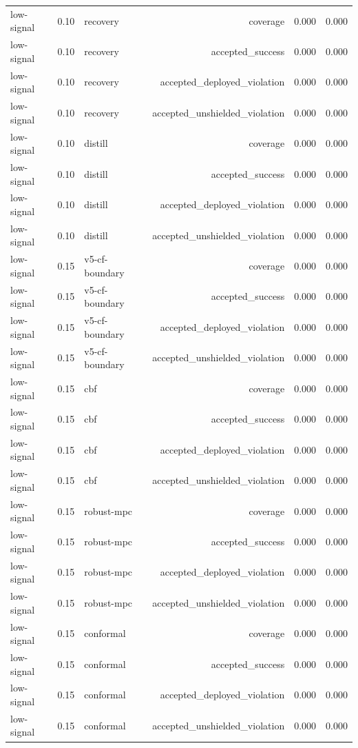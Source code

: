 \documentclass{article}
\begin{document}
\begin{longtable}{@{}lllrrr@{}}
low-signal & 0.10 & recovery & coverage & 0.000 & 0.000 \\
low-signal & 0.10 & recovery & accepted\_success & 0.000 & 0.000 \\
low-signal & 0.10 & recovery & accepted\_deployed\_violation & 0.000 & 0.000 \\
low-signal & 0.10 & recovery & accepted\_unshielded\_violation & 0.000 & 0.000 \\
low-signal & 0.10 & distill & coverage & 0.000 & 0.000 \\
low-signal & 0.10 & distill & accepted\_success & 0.000 & 0.000 \\
low-signal & 0.10 & distill & accepted\_deployed\_violation & 0.000 & 0.000 \\
low-signal & 0.10 & distill & accepted\_unshielded\_violation & 0.000 & 0.000 \\
low-signal & 0.15 & v5-cf-boundary & coverage & 0.000 & 0.000 \\
low-signal & 0.15 & v5-cf-boundary & accepted\_success & 0.000 & 0.000 \\
low-signal & 0.15 & v5-cf-boundary & accepted\_deployed\_violation & 0.000 & 0.000 \\
low-signal & 0.15 & v5-cf-boundary & accepted\_unshielded\_violation & 0.000 & 0.000 \\
low-signal & 0.15 & cbf & coverage & 0.000 & 0.000 \\
low-signal & 0.15 & cbf & accepted\_success & 0.000 & 0.000 \\
low-signal & 0.15 & cbf & accepted\_deployed\_violation & 0.000 & 0.000 \\
low-signal & 0.15 & cbf & accepted\_unshielded\_violation & 0.000 & 0.000 \\
low-signal & 0.15 & robust-mpc & coverage & 0.000 & 0.000 \\
low-signal & 0.15 & robust-mpc & accepted\_success & 0.000 & 0.000 \\
low-signal & 0.15 & robust-mpc & accepted\_deployed\_violation & 0.000 & 0.000 \\
low-signal & 0.15 & robust-mpc & accepted\_unshielded\_violation & 0.000 & 0.000 \\
low-signal & 0.15 & conformal & coverage & 0.000 & 0.000 \\
low-signal & 0.15 & conformal & accepted\_success & 0.000 & 0.000 \\
low-signal & 0.15 & conformal & accepted\_deployed\_violation & 0.000 & 0.000 \\
low-signal & 0.15 & conformal & accepted\_unshielded\_violation & 0.000 & 0.000 \\

\end{longtable}
\end{document}

